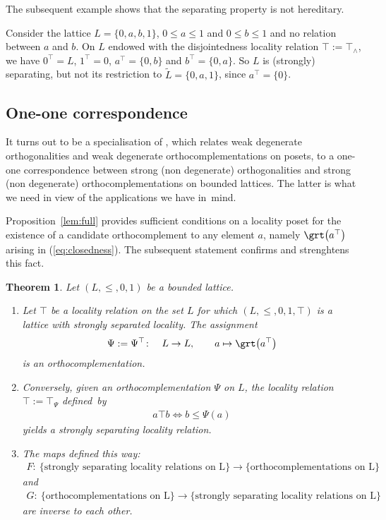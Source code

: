 \documentclass[pdftex]{sigma}
\numberwithin{equation}{section}
\newtheorem{Theorem}{Theorem}[section]
\newcommand{\loc}{locality\xspace}
\newcommand{\pone}{separating\xspace }
\def \ptwob {separated\xspace }
\begin{document}
The subsequent example shows that the \pone property is not hereditary.
	\begin{Example} Consider the lattice
	$L=\{0,a,b,1\}$, $0\leq a\leq 1$ and $0\leq b\leq 1$ and no relation between $a$ and $b$. On $L$ endowed with the disjointedness \loc relation $\top:=\top_\wedge$, we have $0^\top=L$, $1^\top =0$, $a^\top=\{0,b\}$ and $b^\top=\{0,a\}$. So $L$ is (strongly) \pone, but not
	its restriction to $\widetilde L=\{0,a,1\}$, since $a^\top =\{0\}$.
\end{Example}

\subsection {One-one correspondence}
	 It turns out to be a specialisation of \cite[Theorem 3.1]{CM}, which relates weak degenerate orthogonalities and weak degenerate orthocomplementations on posets, to a one-one correspondence between strong (non degenerate) orthogonalities and strong (non degenerate) orthocomplementations on bounded lattices. The latter is what we need in view of the applications we have in~mind.

Proposition~\ref{lem:full} provides sufficient conditions on a locality poset for the existence of a candidate orthocomplement to any element $a$, namely $\grt \big(a^\top\big)$ arising in (\ref{eq:closedness}). The subsequent statement confirms and strenghtens this fact.

\begin{Theorem} \label{thm:complement_strongly_local}
Let $(L, \leq, 0, 1)$ be a bounded lattice.
\begin{enumerate}\itemsep=0pt
	\item Let $\top$ be a \loc relation on the set $L$ for which $(L, \leq, 0,1, \top) $ is a lattice with strongly \ptwob \loc. The assignment
	\begin{gather*}%
	\Psi:=\Psi^\top\colon\quad L\to L,\qquad a\mapsto \grt \big(a^\top\big)
	\end{gather*}
	is an orthocomplementation.
	\item Conversely, given an orthocomplementation $\Psi $ on $L$, the \loc relation $\top:=\top_\Psi$ defi\-ned~by
	\begin{gather*}%
a\top b\Longleftrightarrow b \leq \Psi(a)
\end{gather*}
	yields a strongly \pone \loc relation.
	\item The maps defined this way:
	\begin{gather*}
F\colon\ \{\text{strongly \pone \loc relations on L}\}\to
\{\text{orthocomplementations on L}\}
\end{gather*}
	and
	\begin{gather*}
 G\colon\ \{\text{orthocomplementations on L}\} \to
 \{\text{strongly \pone \loc relations on L}\}
 \end{gather*}
	are inverse to each other.
\end{enumerate}
\end{Theorem}
\end{document}
